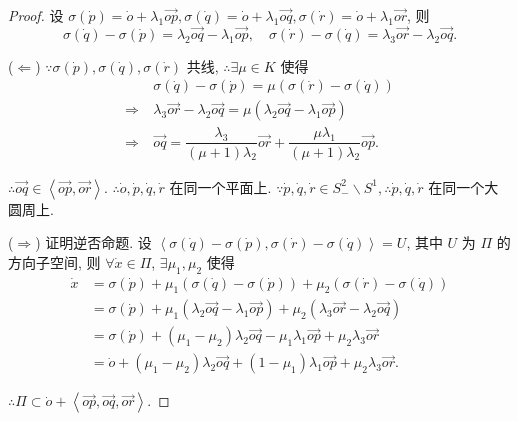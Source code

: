 \documentclass{ctexart}
\begin{document}
\begin{proof}
    设 $\sigma(\dot{p})=\dot{o}+\lambda_1\overrightarrow{op},\sigma(\dot{q})=\dot{o}+\lambda_1\overrightarrow{oq},\sigma(\dot{r})=\dot{o}+\lambda_1\overrightarrow{or}$, 则
    \[\sigma(\dot{q})-\sigma(\dot{p})=\lambda_2\overrightarrow{oq}-\lambda_1\overrightarrow{op},\quad\sigma(\dot{r})-\sigma(\dot{q})=\lambda_3\overrightarrow{or}-\lambda_2\overrightarrow{oq}.\]

    ($\Leftarrow$) $\because\sigma(\dot{p}),\sigma(\dot{q}),\sigma(\dot{r})$ 共线, $\therefore\exists\mu\in K$ 使得
    \begin{align*}
        & \sigma(\dot{q})-\sigma(\dot{p})=\mu(\sigma(\dot{r})-\sigma(\dot{q})) \\
        \Rightarrow\ & \lambda_3\overrightarrow{or}-\lambda_2\overrightarrow{oq}=\mu(\lambda_2\overrightarrow{oq}-\lambda_1\overrightarrow{op}) \\
        \Rightarrow\ & \overrightarrow{oq}=\dfrac{\lambda_3}{(\mu+1)\lambda_2}\overrightarrow{or}+\dfrac{\mu\lambda_1}{(\mu+1)\lambda_2}\overrightarrow{op}.
    \end{align*}

    $\therefore\overrightarrow{oq}\in\left<\overrightarrow{op},\overrightarrow{or}\right>$. $\therefore\dot{o},\dot{p},\dot{q},\dot{r}$ 在同一个平面上. $\because\dot{p},\dot{q},\dot{r}\in S^2_-\backslash S^1,\therefore\dot{p},\dot{q},\dot{r}$ 在同一个大圆周上.

    ($\Rightarrow$) 证明逆否命题. 设 $\left<\sigma(\dot{q})-\sigma(\dot{p}),\sigma(\dot{r})-\sigma(\dot{q})\right>=U$, 其中 $U$ 为 $\varPi$ 的方向子空间, 则 $\forall\dot{x}\in\varPi$, $\exists\mu_1,\mu_2$ 使得
    \begin{align*}
        \dot{x} & =\sigma(\dot{p})+\mu_1(\sigma(\dot{q})-\sigma(\dot{p}))+\mu_2(\sigma(\dot{r})-\sigma(\dot{q})) \\
        & =\sigma(\dot{p})+\mu_1(\lambda_2\overrightarrow{oq}-\lambda_1\overrightarrow{op})+\mu_2(\lambda_3\overrightarrow{or}-\lambda_2\overrightarrow{oq}) \\
        & =\sigma(\dot{p})+(\mu_1-\mu_2)\lambda_2\overrightarrow{oq}-\mu_1\lambda_1\overrightarrow{op}+\mu_2\lambda_3\overrightarrow{or} \\
        & =\dot{o}+(\mu_1-\mu_2)\lambda_2\overrightarrow{oq}+(1-\mu_1)\lambda_1\overrightarrow{op}+\mu_2\lambda_3\overrightarrow{or}.
    \end{align*}

    $\therefore\varPi\subset\dot{o}+\left<\overrightarrow{op},\overrightarrow{oq},\overrightarrow{or}\right>$.


\end{proof}
\end{document}
